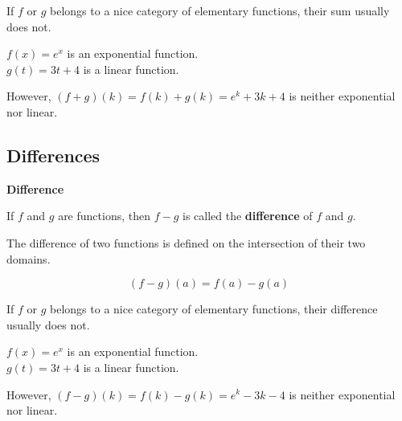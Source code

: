 \documentclass{ximera}
\begin{document}
\begin{warning}

If $f$ or $g$ belongs to a nice category of elementary functions, their sum usually does not.

\end{warning}




\begin{example}

$f(x) = e^x$ is an exponential function. \\
$g(t) = 3 t + 4$ is a linear function. 

However, $(f + g)(k) = f(k) + g(k) = e^k + 3 k + 4$ is neither exponential nor linear.

\end{example}








\subsection*{Differences}



\begin{template}  \textbf{\textcolor{blue!55!black}{Difference}} 


If  $f$ and $g$ are functions, then $f - g$ is called the \textbf{difference} of $f$ and $g$. 

The difference of two functions is defined on the intersection of their two domains. 


\[ (f - g)(a) = f(a) - g(a)  \]



\end{template}



\begin{warning}

If $f$ or $g$ belongs to a nice category of elementary functions, their difference usually does not.

\end{warning}





\begin{example}

$f(x) = e^x$ is an exponential function. \\
$g(t) = 3 t + 4$ is a linear function. 

However, $(f - g)(k) = f(k) - g(k) = e^k - 3 k - 4$ is neither exponential nor linear.

\end{example}
\end{document}
